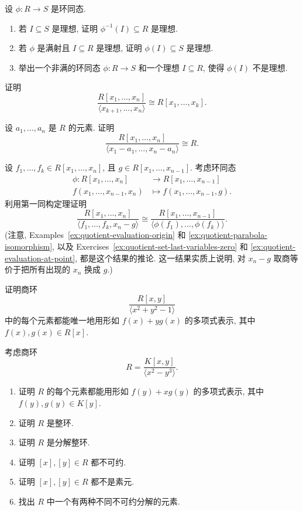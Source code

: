 \begin{BookExercises}
  \item\label{ex:ideal-images-and-preimages} 设 $\phi:R\to S$ 是环同态.
    \begin{enumerate}[label=(\alph*)]
      \item 若 $I\subseteq S$ 是理想, 证明 $\phi^{-1}(I)\subseteq R$ 是理想.
      \item 若 $\phi$ 是满射且 $I\subseteq R$ 是理想, 证明 $\phi(I)\subseteq S$ 是理想.
      \item 举出一个非满的环同态 $\phi:R\to S$ 和一个理想 $I\subseteq R$, 使得 $\phi(I)$ 不是理想.
    \end{enumerate}
  \item\label{ex:quotient-set-last-variables-zero} 证明
    \[
      \frac{R[x_{1},\ldots,x_{n}]}{\langle x_{k+1},\ldots,x_{n}\rangle}\cong R[x_{1},\ldots,x_{k}].
    \]
  \item\label{ex:quotient-evaluation-at-point} 设 $a_{1},\ldots,a_{n}$ 是 $R$ 的元素. 证明
    \[
      \frac{R[x_{1},\ldots,x_{n}]}{\langle x_{1}-a_{1},\ldots,x_{n}-a_{n}\rangle}\cong R.
    \]
  \item\label{ex:quotient-substitute-polynomial} 设 $f_{1},\ldots,f_{k}\in R[x_{1},\ldots,x_{n}]$, 且 $g\in R[x_{1},\ldots,x_{n-1}]$. 考虑环同态
    \[
      \begin{aligned}
        \phi:R[x_{1},\ldots,x_{n}]&\to R[x_{1},\ldots,x_{n-1}]\\
        f(x_{1},\ldots,x_{n-1},x_{n})&\mapsto f(x_{1},\ldots,x_{n-1},g).
      \end{aligned}
    \]
    利用第一同构定理证明
    \[
      \frac{R[x_{1},\ldots,x_{n}]}{\langle f_{1},\ldots,f_{k},x_{n}-g\rangle}
      \cong\frac{R[x_{1},\ldots,x_{n-1}]}{\langle\phi(f_{1}),\ldots,\phi(f_{k})\rangle}.
    \]
    (注意, Examples~\ref{ex:quotient-evaluation-origin} 和 \ref{ex:quotient-parabola-isomorphism}, 以及 Exercises~\ref{ex:quotient-set-last-variables-zero} 和 \ref{ex:quotient-evaluation-at-point}, 都是这个结果的推论. 这一结果实质上说明, 对 $x_{n}-g$ 取商等价于把所有出现的 $x_{n}$ 换成 $g$.)
  \item\label{ex:unit-circle-quotient-normal-form} 证明商环
    \[
      \frac{R[x,y]}{\langle x^{2}+y^{2}-1\rangle}
    \]
    中的每个元素都能唯一地用形如 $f(x)+yg(x)$ 的多项式表示, 其中 $f(x),g(x)\in R[x]$.
  \item\label{ex:factorization-domain-not-unique} 考虑商环
    \[
      R=\frac{K[x,y]}{\langle x^{2}-y^{3}\rangle}.
    \]
    \begin{enumerate}[label=(\alph*)]
      \item 证明 $R$ 的每个元素都能用形如 $f(y)+xg(y)$ 的多项式表示, 其中 $f(y),g(y)\in K[y]$.
      \item 证明 $R$ 是整环.
      \item 证明 $R$ 是分解整环.
      \item 证明 $[x],[y]\in R$ 都不可约.
      \item 证明 $[x],[y]\in R$ 都不是素元.
      \item 找出 $R$ 中一个有两种不同不可约分解的元素.
    \end{enumerate}
\end{BookExercises}
